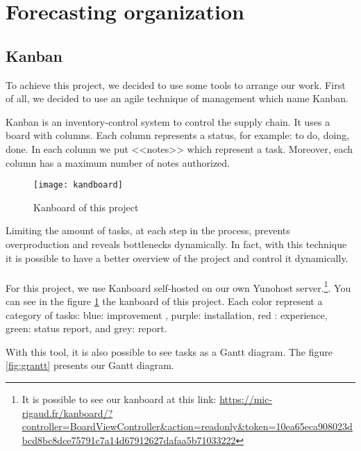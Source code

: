 \section{Forecasting organization}

\subsection{Kanban}

To achieve this project, we decided to use some tools to arrange our work. First of all, we decided to use an agile
technique of management which name Kanban.~\\



Kanban is an inventory-control system to control the supply chain. It uses a board with columns. Each column
represents a status, for example: to do, doing, done. In each column we put <<notes>> which represent a task.
Moreover, each column has a maximum number of notes authorized.


\begin{figure}[h]
  \centering
  \texttt{[image: kandboard]}
  \caption{Kanboard of this project}
  \label{fig:kanboard}
\end{figure}


Limiting the amount of tasks, at each step in the process, prevents overproduction and reveals bottlenecks
dynamically. In fact, with this technique it is possible to have a better overview of the project and control it
dynamically.
~\\

For this project, we use Kanboard\cite{guillot:kanboard} self-hosted on our own Yunohost server.\footnote{ It is possible to
  see our kanboard at this link:
  \url{https://mic-rigaud.fr/kanboard/?controller=BoardViewController&action=readonly&token=10ea65eca908023dbcd8bc8dce75791c7a14d67912627dafaa5b71033222}}.
You can see in the figure \ref{fig:kanboard} the kanboard of this project. Each color represent a category of tasks:
blue: improvement , purple: installation, red : experience, green: status report, and grey: report.

With this tool, it is also possible to see tasks as a Gantt diagram. The figure \ref{fig:grantt} presents our
Gantt diagram.

